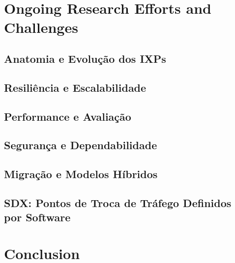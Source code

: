 \documentclass[12pt]{article}
\begin{document}
\section{Ongoing Research Efforts and Challenges}
\label{sec:ongoingresearch}

\subsection{Anatomia e Evolução dos IXPs}
\subsection{Resiliência e Escalabilidade}
\subsection{Performance e Avaliação}
\subsection{Segurança e Dependabilidade}
\subsection{Migração e Modelos Híbridos}
\subsection{SDX: Pontos de Troca de Tráfego Definidos por Software}

\section{Conclusion}
\label{sec:conclusion}




\end{document}

